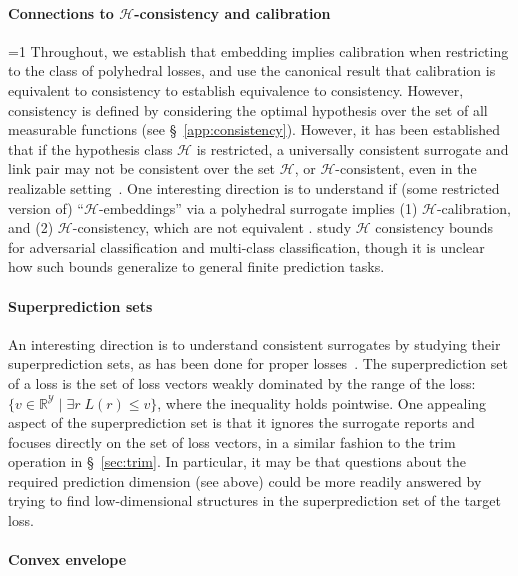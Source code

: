 \documentclass[twoside,11pt]{article}
\newcommand{\CommentsR}{1}
\newcommand{\reviewerresponse}[2]{\ifnum\CommentsR=1%
  \todo[linecolor=#1!80!black,backgroundcolor=#1,bordercolor=#1!80!black]{#2}\fi}
\newcommand{\reviewertwo}[1]{\reviewerresponse{blue!20!white}{R2: #1}}
\newcommand{\reals}{\mathbb{R}}
\renewcommand{\H}{\mathcal{H}}
\newcommand{\Y}{\mathcal{Y}}
\begin{document}
\paragraph{Connections to $\H$-consistency and calibration}
\reviewertwo{Comment 1}
Throughout, we establish that embedding implies calibration when restricting to the class of polyhedral losses, and use the canonical result that calibration is equivalent to consistency to establish equivalence to consistency.
However, consistency is defined by considering the optimal hypothesis over the set of all measurable functions (see \S~\ref{app:consistency}).
However, it has been established that if the hypothesis class $\H$ is restricted, a universally consistent surrogate and link pair may not be consistent over the set $\H$, or $\H$-consistent, even in the realizable setting~\citep{long2013consistency,kuznetov2014multiclass,zhang2020bayes}.
One interesting direction is to understand if (some restricted version of) ``$\H$-embeddings'' via a polyhedral surrogate implies (1) $\H$-calibration, and (2) $\H$-consistency, which are not equivalent \citep{awasthi2021calibration,awasthi2021finer}.
\citet{awasthi2022hconsistency,awasthi2022multi} study $\H$ consistency bounds for adversarial classification and multi-class classification, though it is unclear how such bounds generalize to general finite prediction tasks.


\paragraph{Superprediction sets}

An interesting direction is to understand consistent surrogates by studying their superprediction sets, as has been done for proper losses~\citep{williamson2014geometry}.
The superprediction set of a loss is the set of loss vectors weakly dominated by the range of the loss: $\{v \in \reals^\Y \mid \exists r\; L(r) \leq v\}$, where the inequality holds pointwise.
One appealing aspect of the superprediction set is that it ignores the surrogate reports and focuses directly on the set of loss vectors, in a similar fashion to the trim operation in \S~\ref{sec:trim}.
In particular, it may be that questions about the required prediction dimension (see above) could be more readily answered by trying to find low-dimensional structures in the superprediction set of the target loss.


\paragraph{Convex envelope}
\end{document}
